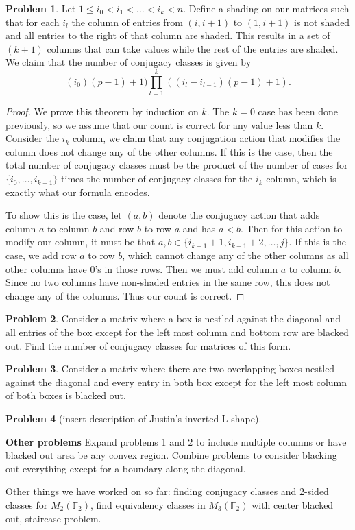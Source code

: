 \documentclass[12pt]{article}
\theoremstyle{definition}
\newtheorem{problem}{Problem}
\theoremstyle{remark}
\newcommand{\FF}{\mathbb{F}}
\begin{document}
\begin{problem}

Let $1\leq i_0 <i_1 <\ldots <i_k <n$. Define a shading on our matrices such that for each $i_l$ the column of entries from $(i,i+1)$ to $(1,i+1)$ is not shaded and all entries to the right of that column are shaded. This results in a set of $(k+1)$ columns that can take values while the rest of the entries are shaded. We claim that the number of conjugacy classes is given by 
$$
    (i_0)(p-1)+1)\prod_{l=1}^k \left( (i_l-i_{l-1})(p-1)+1\right).
$$
\end{problem}

\begin{proof}
    We prove this theorem by induction on $k$. The $k=0$ case has been done previously, so we assume that our count is correct for any value less than $k$. Consider the $i_k$ column, we claim that any conjugation action that modifies the column does not change any of the other columns. If this is the case, then the total number of conjugacy classes must be the product of the number of cases for $\{ i_0,\ldots,i_{k-1}\}$ times the number of conjugacy classes for the $i_k$ column, which is exactly what our formula encodes. 

    To show this is the case, let $(a,b)$ denote the conjugacy action that adds column $a$ to column $b$ and row $b$ to row $a$ and has $a<b$. Then for this action to modify our column, it must be that $a,b\in \{ i_{k-1}+1,i_{k-1}+2,\ldots, j\}$. If this is the case, we add row $a$ to row $b$, which cannot change any of the other columns as all other columns have $0$'s in those rows. Then we must add column $a$ to column $b$. Since no two columns have non-shaded entries in the same row, this does not change any of the columns. Thus our count is correct.
\end{proof}

\begin{problem}
Consider a matrix where a box is nestled against the diagonal and all entries of the box except for the left most column and bottom row are blacked out. Find the number of conjugacy classes for matrices of this form.
\end{problem}

\begin{problem}
Consider a matrix where there are two overlapping boxes nestled against the diagonal and every entry in both box except for the left most column of both boxes is blacked out.
\end{problem}

\begin{problem}
[insert description of Justin's inverted L shape]
\end{problem}

\textbf{Other problems}
Expand problems 1 and 2 to include multiple columns or have blacked out area be any convex region. Combine problems to consider blacking out everything except for a boundary along the diagonal.

Other things we have worked on so far: finding conjugacy classes and 2-sided classes for  $M_2(\FF_2)$, find equivalency classes in $M_3(\mathbb{F}_2)$ with center blacked out, staircase problem.
\end{document}
